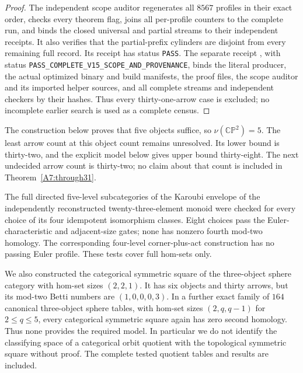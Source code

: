\begin{proof}
The independent scope auditor regenerates all $8567$ profiles in
their exact order, checks every theorem flag, joins all per-profile
counters to the complete run, and binds the closed universal and
partial streams to their independent receipts. It also verifies
that the partial-prefix cylinders are disjoint from every remaining
full record. Its receipt
 has status
\texttt{PASS}. The separate receipt
, with status
\texttt{PASS\_COMPLETE\_V15\_SCOPE\_AND\_PROVENANCE}, binds the
literal producer, the actual optimized binary and build manifests,
the proof files, the scope auditor and its imported helper sources,
and all complete streams and independent checkers by their hashes.
Thus every thirty-one-arrow case is excluded; no incomplete earlier
search is used as a complete census.
\end{proof}

\begin{remark*}
The construction below proves that five objects suffice, so
$\nu(\mathbb{CP}^2)=5$. The least arrow count at this object
count remains unresolved. Its lower bound is thirty-two,
and the explicit model below gives upper bound thirty-eight.
The next undecided arrow count is thirty-two; no claim about
that count is included in Theorem~\ref{A7:through31}.
\end{remark*}

\begin{remark*}
The full directed five-level subcategories of the Karoubi envelope
of the independently reconstructed twenty-three-element monoid were
checked for every choice of its four idempotent isomorphism classes.
Eight choices pass the Euler-characteristic and adjacent-size gates;
none has nonzero fourth mod-two homology. The corresponding
four-level corner-plus-act construction has no passing Euler profile.
These tests cover full hom-sets only.

We also constructed the categorical symmetric square of the
three-object sphere category with hom-set sizes $(2,2,1)$.
It has six objects and thirty arrows, but its mod-two Betti numbers
are $(1,0,0,0,3)$. In a further exact family of $164$ canonical
three-object sphere tables, with hom-set sizes $(2,q,q-1)$ for
$2\le q\le5$, every categorical symmetric square again has zero
second homology. Thus none provides the required model. In
particular we do not identify the classifying space of a categorical
orbit quotient with the topological symmetric square without proof.
The complete tested quotient tables and results are included.
\end{remark*}
